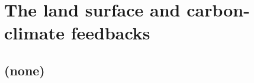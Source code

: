 
\cleardoublepage


\chapter{The land surface and carbon-climate feedbacks}\label{ch:land-surface}

\hfill \break

\newpage

\section{(none)}

